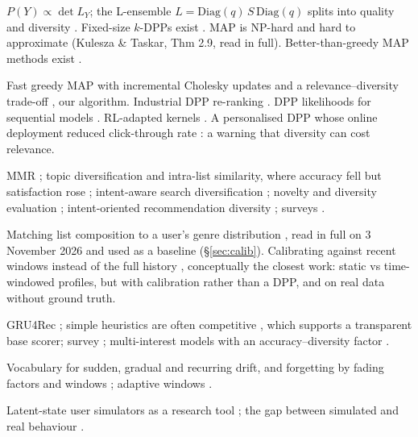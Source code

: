 \documentclass[11pt,a4paper]{article}
\begin{document}
\begin{description}[style=nextline]
  \item[DPPs] $P(Y)\propto\det L_Y$; the L-ensemble $L=\mathrm{Diag}(q)\,S\,\mathrm{Diag}(q)$ splits
        into quality and diversity \citep{kulesza2012dpp}. Fixed-size $k$-DPPs exist
        \citep{kulesza2011kdpp}. MAP is NP-hard \citep{ko1995exact} and hard to approximate
        (Kulesza \& Taskar, Thm 2.9, read in full). Better-than-greedy MAP methods exist
        \citep{gillenwater2012map}.
  \item[DPP recommendation] Fast greedy MAP with incremental Cholesky updates and a
        relevance--diversity trade-off \citep{chen2018fast}, our algorithm. Industrial DPP
        re-ranking \citep{wilhelm2018youtube}. DPP likelihoods for sequential models
        \citep{liu2022dppseq}. RL-adapted kernels \citep{liu2019d2rl}. A personalised DPP whose
        online deployment reduced click-through rate \citep{ibrahim2025personalized}: a warning
        that diversity can cost relevance.
  \item[Diversity and intent] MMR \citep{carbonell1998mmr}; topic diversification and
        intra-list similarity, where accuracy fell but satisfaction rose
        \citep{ziegler2005topic}; intent-aware search diversification
        \citep{agrawal2009diversifying}; novelty and diversity evaluation
        \citep{clarke2008novelty}; intent-oriented recommendation diversity
        \citep{vargas2011intent}; surveys \citep{kaminskas2016diversity,wu2024diversification}.
  \item[Calibration] Matching list composition to a user's genre distribution
        \citep{steck2018calibrated}, read in full on 3 November 2026 and used as a
        baseline (\S\ref{sec:calib}). Calibrating against recent windows instead of the full history
        \citep{lin2024beyond}, conceptually the closest work: static vs time-windowed profiles,
        but with calibration rather than a DPP, and on real data without ground truth.
  \item[Session-based] GRU4Rec \citep{hidasi2016gru4rec}; simple heuristics are often
        competitive \citep{ludewig2018evaluation}, which supports a transparent base scorer;
        survey \citep{wang2021survey}; multi-interest models with an accuracy--diversity factor
        \citep{cen2020comirec}.
  \item[Drift] Vocabulary for sudden, gradual and recurring drift, and forgetting by fading
        factors and windows \citep{gama2014survey}; adaptive windows \citep{bifet2007adwin}.
  \item[Simulation] Latent-state user simulators as a research tool \citep{ie2019recsim}; the
        gap between simulated and real behaviour \citep{stavinova2022synthetic}.
\end{description}
\end{document}
